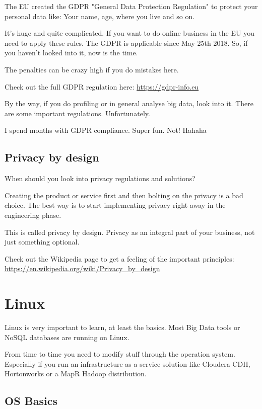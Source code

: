\documentclass[12pt, numbers=noenddot]{scrreprt} %
\begin{document}
The EU created the GDPR "General Data Protection Regulation" to protect your personal data like: Your name, age, where you live and so on.

It's huge and quite complicated. If you want to do online business in the EU you need to apply these rules. The GDPR is applicable since May 25th 2018. So, if you haven't looked into it, now is the time. 

The penalties can be crazy high if you do mistakes here.

Check out the full GDPR regulation here: \url{https://gdpr-info.eu}

By the way, if you do profiling or in general analyse big data, look into it. There are some important regulations. Unfortunately.

I spend months with GDPR compliance. Super fun. Not! Hahaha

\section{Privacy by design}

When should you look into privacy regulations and solutions?

Creating the product or service first and then bolting on the privacy is a bad choice. The best way is to start implementing privacy right away in the engineering phase.

This is called privacy by design. Privacy as an integral part of your business, not just something optional.

Check out the Wikipedia page to get a feeling of the important principles: \url{https://en.wikipedia.org/wiki/Privacy_by_design} 

\chapter{Linux}

Linux is very important to learn, at least the basics. Most Big Data tools or NoSQL databases are running on Linux.

From time to time you need to modify stuff through the operation system. Especially if you run an infrastructure as a service solution like Cloudera CDH, Hortonworks or a MapR Hadoop distribution.

\section{OS Basics}
\end{document}
